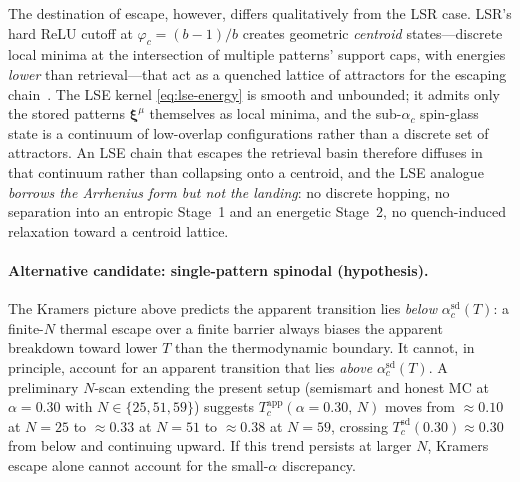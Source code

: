 \documentclass[11pt]{article}
\newcommand{\bxi}{\boldsymbol{\xi}}
\newcommand{\acSd}{\alpha_c^{\mathrm{sd}}}
\begin{document}
The destination of escape, however, differs qualitatively from the LSR
case. LSR's hard ReLU cutoff at $\varphi_c = (b-1)/b$ creates
geometric \emph{centroid} states---discrete local minima at the
intersection of multiple patterns' support caps, with energies
\emph{lower} than retrieval---that act as a quenched lattice of
attractors for the escaping chain~\citep{petrova2026metastable}. The
LSE kernel \eqref{eq:lse-energy} is smooth and unbounded; it admits
only the stored patterns $\bxi^\mu$ themselves as local minima, and the
sub-$\alpha_c$ spin-glass state is a continuum of low-overlap
configurations rather than a discrete set of attractors. An LSE chain
that escapes the retrieval basin therefore diffuses in that continuum
rather than collapsing onto a centroid, and the LSE analogue
\emph{borrows the Arrhenius form but not the landing}: no discrete
hopping, no separation into an entropic Stage~1 and an energetic
Stage~2, no quench-induced relaxation toward a centroid lattice.

\paragraph{Alternative candidate: single-pattern spinodal
(hypothesis).}
\label{sec:mc:spinodal}
The Kramers picture above predicts the apparent transition lies
\emph{below} $\acSd(T)$: a finite-$N$ thermal escape over a finite
barrier always biases the apparent breakdown toward lower $T$ than
the thermodynamic boundary. It cannot, in principle, account for an
apparent transition that lies \emph{above} $\acSd(T)$. A preliminary
$N$-scan extending the present setup (semismart and honest MC at
$\alpha = 0.30$ with $N \in \{25, 51, 59\}$) suggests
$T_c^{\mathrm{app}}(\alpha=0.30,\,N)$ moves from $\approx 0.10$ at
$N=25$ to $\approx 0.33$ at $N=51$ to $\approx 0.38$ at $N=59$,
crossing $T_c^{\mathrm{sd}}(0.30)\approx 0.30$ from below and
continuing upward. If this trend persists at larger $N$, Kramers
escape alone cannot account for the small-$\alpha$ discrepancy.
\end{document}
